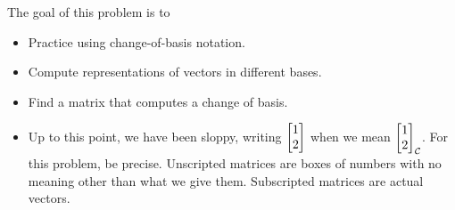 \documentclass{workbook}
\newcommand{\displayonlynewpage}{\begin{displayonly}\newpage\end{displayonly}}
\newcommand{\bookonlynewpage}{\begin{bookonly}\newpage\end{bookonly}}
\begin{document}
\begin{slide}
\displayonlynewpage
	\bookonlynewpage

	\question
	\begin{annotation}
		\begin{goals}

			The goal of this problem is to
		\displayonlynewpage
			\begin{itemize}
				\item Practice using change-of-basis notation.
				\item Compute representations of vectors in different bases.
				\item Find a matrix that computes a change of basis.
			\end{itemize}
		\end{goals}

		\begin{notes}
			\begin{itemize}
				\item Up to this point, we have been sloppy, writing $\mat{1\\2}$ when
					we mean $\mat{1\\2}_{\mathcal C}$. For this problem, be precise.
					Unscripted matrices are boxes of numbers with no meaning other
					than what we give them. Subscripted matrices are actual vectors.


\end{itemize}
\end{notes}
\end{annotation}
\end{slide}
\end{document}
